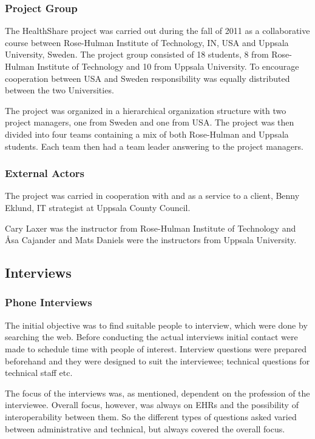 \documentclass[14pt]{article}
\begin{document}
\subsubsection{Project Group}
The HealthShare project was carried out during the fall of 2011 as a collaborative course between Rose-Hulman Institute of Technology, IN, USA and Uppsala University, Sweden.
The project group consisted of 18 students, 8 from Rose-Hulman Institute of Technology and 10 from Uppsala University. To encourage cooperation between USA and Sweden responsibility was equally distributed between the two Universities.

The project was organized in a hierarchical organization structure with two project managers, one from Sweden and one from USA. The project was then divided into four teams containing a mix of both Rose-Hulman and Uppsala students. Each team then had a team leader answering to the project managers.

\subsubsection{External Actors}
The project was carried in cooperation with and as a service to a client, Benny Eklund, IT strategist at Uppsala County Council.

Cary Laxer was the instructor from Rose-Hulman Institute of Technology and Åsa Cajander and Mats Daniels were the instructors from Uppsala University.

\subsection{Interviews}

\subsubsection{Phone Interviews}

The initial objective was to find suitable people to interview, which were done by searching the web. Before conducting the actual interviews initial contact were made to schedule time with people of interest. Interview questions were prepared  beforehand and they were designed to suit the interviewee; technical questions for technical staff etc. 

The focus of the interviews was, as mentioned, dependent on the profession of the interviewee. Overall focus, however, was always on \glspl{EHR} and the possibility of interoperability between them. So the different types of questions asked varied between administrative and technical, but always covered the overall focus. 
\end{document}

